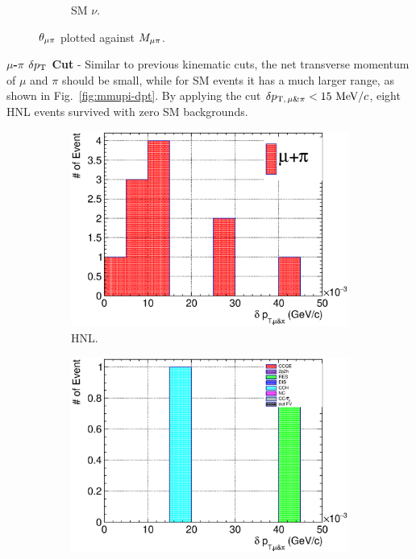 \begin{figure}[!htb]
\begin{subfigure}{\dbfigwid\textwidth}
                \caption{SM $\nu$.}
                \label{fig:sm-mmupi}
           \end{subfigure}
           \caption{$\theta_{\mu\pi}$ plotted against $M_{\mu\pi}$.}
           \label{fig:mmupi-mupiang}
        \end{figure}

        \textbf{$\mu$-$\pi$ $\delta p_\textrm{T}$ Cut} - Similar to previous kinematic cuts, the net transverse momentum of $\mu$ and $\pi$ should be small, while for SM events it has a much larger range, as shown in Fig.~\ref{fig:mmupi-dpt}. By applying the cut $\delta p_{\textrm{T},\,\mu\&\pi}<15~\textrm{MeV}/c$, eight HNL events survived with zero SM backgrounds.

        \begin{figure}[!htb]
           \centering
           \begin{subfigure}{0.45\textwidth}
                \includegraphics[width=\textwidth]{figures/hnl/hnl_sfgmu_mpdpt_stack_al9_300_aftmupikin.eps}
                \caption{HNL.}
                \label{fig:hnl-mupidpt}
           \end{subfigure}
           \begin{subfigure}{0.45\textwidth}
                \includegraphics[width=\textwidth]{figures/hnl/hnl_sfgmu_mpdpt_stack_al9_SM_aftmupikin.eps}

\end{subfigure}
\end{figure}
